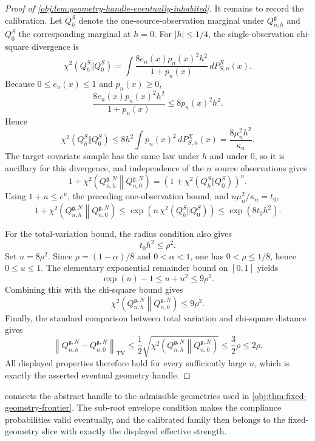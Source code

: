 \documentclass[11pt]{article}
\begin{document}
\begin{proof}[Proof of \cref{obj:lem:geometry-handle-eventually-inhabited}]
It remains to record the calibration. Let \(Q_h^S\) denote the one-source-observation marginal under \(Q_{n,h}^{\mathfrak g}\) and \(Q_0^S\) the corresponding marginal at \(h=0\). For \(|h|\le1/4\), the single-observation chi-square divergence is
\[
\chi^2(Q_h^S\Vert Q_0^S)
=
\int
\frac{8e_n(x)p_n(x)^2h^2}{1+p_n(x)}
\,dP_{S,n}^X(x).
\] %
Because \(0\le e_n(x)\le1\) and \(p_n(x)\ge0\),
\[
\frac{8e_n(x)p_n(x)^2h^2}{1+p_n(x)}
\le
8p_n(x)^2h^2 .
\]
Hence
\[
\chi^2(Q_h^S\Vert Q_0^S)
\le
8h^2\int p_n(x)^2\,dP_{S,n}^X(x)
=
\frac{8\mu_n^2h^2}{\kappa_n}.
\] %
The target covariate sample has the same law under \(h\) and under \(0\), so it is ancillary for this divergence, and independence of the \(n\) source observations gives
\[
1+\chi^2\!\left(Q_{n,h}^{\mathfrak g,N}\middle\|Q_{n,0}^{\mathfrak g,N}\right)
=
\left(1+\chi^2(Q_h^S\Vert Q_0^S)\right)^n .
\] %
Using \(1+u\le e^u\), the preceding one-observation bound, and \(n\mu_n^2/\kappa_n=t_0\),
\[
1+\chi^2\!\left(Q_{n,h}^{\mathfrak g,N}\middle\|Q_{n,0}^{\mathfrak g,N}\right)
\le
\exp\!\left(n\,\chi^2(Q_h^S\Vert Q_0^S)\right)
\le
\exp(8t_0h^2).
\] %

For the total-variation bound, the radius condition also gives
\[
t_0h^2\le \rho^2 .
\] %
Set \(u=8\rho^2\). Since \(\rho=(1-\alpha)/8\) and \(0<\alpha<1\), one has \(0<\rho\le1/8\), hence \(0\le u\le1\). The elementary exponential remainder bound on \([0,1]\) yields
\[
\exp(u)-1\le u+u^2\le 9\rho^2 .
\] %
Combining this with the chi-square bound gives
\[
\chi^2\!\left(Q_{n,h}^{\mathfrak g,N}\middle\|Q_{n,0}^{\mathfrak g,N}\right)
\le 9\rho^2 .
\] %
Finally, the standard comparison between total variation and chi-square distance gives
\[
\left\|Q_{n,h}^{\mathfrak g,N}-Q_{n,0}^{\mathfrak g,N}\right\|_{\mathrm{TV}}
\le
\frac12
\sqrt{
\chi^2\!\left(Q_{n,h}^{\mathfrak g,N}\middle\|Q_{n,0}^{\mathfrak g,N}\right)}
\le
\frac32\rho
\le
2\rho .
\] %
All displayed properties therefore hold for every sufficiently large \(n\), which is exactly the asserted eventual geometry handle. %
\end{proof}

 connects the abstract handle to the admissible geometries used in \cref{obj:thm:fixed-geometry-frontier}. The sub-root envelope condition makes the compliance probabilities valid eventually, and the calibrated family then belongs to the fixed-geometry slice with exactly the displayed effective strength.
\end{document}
